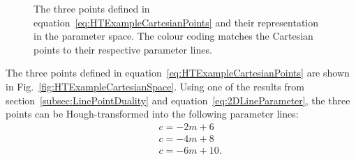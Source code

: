 \begin{figure}%
  \centering
   \hspace{1em}
  \caption{The three points defined in equation~\ref{eq:HTExampleCartesianPoints} and their representation in the parameter space.  The colour coding matches the Cartesian points to their respective parameter lines.}
  \label{fig:HTExample}
\end{figure}
\newline
\newline
The three points defined in equation~\ref{eq:HTExampleCartesianPoints} are shown in Fig.~\ref{fig:HTExampleCartesianSpace}.  Using one of the results from section~\ref{subsec:LinePointDuality} and equation~\ref{eq:2DLineParameter}, the three points can be Hough-transformed into the following parameter lines:
\begin{equation}
  \begin{split}
    &\quad c = -2m + 6 \\
    &\quad c = -4m + 8 \\
    &\quad c = -6m + 10.
  \end{split}
  \label{eq:HTExampleParameterLines}
\end{equation}
